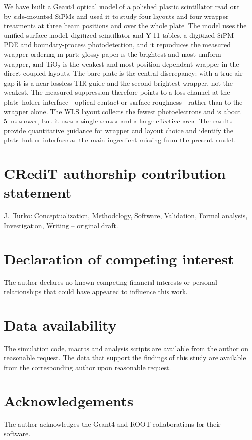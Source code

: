 \documentclass[preprint,12pt]{elsarticle}
\newcommand{\gfour}{Geant4}
\begin{document}
We have built a \gfour{} optical model of a polished plastic scintillator read
out by side-mounted SiPMs and used it to study four layouts and four wrapper
treatments at three beam positions and over the whole plate. The model uses the
unified surface model, digitized scintillator and Y-11 tables, a digitized SiPM
PDE and boundary-process photodetection, and it reproduces the measured wrapper
ordering in part: glossy paper is the brightest and most uniform wrapper, and
TiO$_2$ is the weakest and most position-dependent wrapper in the direct-coupled
layouts. The bare plate is the central discrepancy: with a true air gap it is a
near-lossless TIR guide and the second-brightest wrapper, not the weakest. The
measured suppression therefore points to a loss channel at the plate--holder
interface---optical contact or surface roughness---rather than to the wrapper
alone. The WLS layout collects the fewest photoelectrons and is about
\SI{5}{\nano\second} slower, but it uses a single sensor and a large effective
area. The results provide quantitative guidance for wrapper and layout choice
and identify the plate--holder interface as the main ingredient missing from the
present model.

\section*{CRediT authorship contribution statement}
J.~Turko: Conceptualization, Methodology, Software, Validation, Formal analysis,
Investigation, Writing -- original draft.

\section*{Declaration of competing interest}
The author declares no known competing financial interests or personal
relationships that could have appeared to influence this work.

\section*{Data availability}
The simulation code, macros and analysis scripts are available from the author
on reasonable request. The data that support the findings of this study are
available from the corresponding author upon reasonable request.

\section*{Acknowledgements}
The author acknowledges the \gfour{} and ROOT collaborations for their software.



\end{document}
